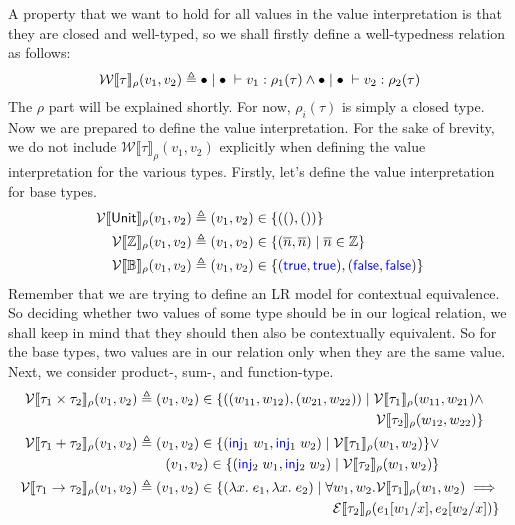 \documentclass[twoside,11pt,openright]{report}
\theoremstyle{definition}
\newcommand{\Keyword}[1]{{\color{blue} \mathsf{#1}}}
\newcommand{\var}{x}
\newcommand{\expr}{e}
\newcommand{\val}{v}
\newcommand{\valB}{w}
\newcommand{\TT}{()}
\newcommand{\Num}[1]{\overline{#1}}
\newcommand{\True}{\Keyword{true}}
\newcommand{\False}{\Keyword{false}}
\newcommand{\Inj}[1]{\Keyword{inj}_{#1}\;}
\newcommand{\subst}[3]{#1{\left[#3 \middle/ #2 \right]}}
\newcommand{\Tunit}{\mathsf{Unit}}
\newcommand{\Tint}{\mathbb{Z}}
\newcommand{\Tbool}{\mathbb{B}}
\newcommand{\Tprod}[2]{#1 \times #2}
\newcommand{\Tsum}[2]{#1 + #2}
\newcommand{\Tfunc}[2]{#1 \rightarrow #2}
\newcommand{\typ}{\tau}
\newcommand{\emptenv}{\bullet}
\newcommand{\empvenv}{\bullet}
\newcommand{\jdg}[4]{#1 \; | \; #2 \; \vdash #3 : #4}
\newcommand{\WtInp}[2]{\mathcal{W} \llbracket #1 \rrbracket_{#2}}
\newcommand{\WtInpGen}[2]{\WtInp{#1}{#2}(\val_1, \val_2)}
\newcommand{\ValInp}[2]{\mathcal{V} \llbracket #1 \rrbracket_{#2}}
\newcommand{\ValInpGen}[2]{\ValInp{#1}{#2}(\val_1, \val_2)}
\newcommand{\ExpInp}[2]{\mathcal{E} \llbracket #1 \rrbracket_{#2}}
\begin{document}
A property that we want to hold for all values in the value interpretation is that they are closed and well-typed, so we shall firstly define a well-typedness relation as follows:
\begin{equation*}
  \WtInpGen{\typ}{\rho} \triangleq \jdg{\emptenv}{\empvenv}{\val_1}{\rho_1(\typ)} \land \jdg{\emptenv}{\empvenv}{\val_2}{\rho_2(\typ)}\\
\end{equation*}
The $\rho$ part will be explained shortly. For now, $\rho_i(\typ)$ is simply a closed type.\\
Now we are prepared to define the value interpretation. For the sake of brevity, we do not include $\WtInpGen{\typ}{\rho}$ explicitly when defining the value interpretation for the various types. Firstly, let's define the value interpretation for base types.
\begin{align*}
  \ValInpGen{\Tunit}{\rho}  &\triangleq (\val_1, \val_2) \in \{(\TT, \TT)\}\\
  \ValInpGen{\Tint}{\rho}   &\triangleq (\val_1, \val_2) \in \{(\Num{n}, \Num{n}) \mid \Num{n} \in \Tint\}\\
  \ValInpGen{\Tbool}{\rho}  &\triangleq (\val_1, \val_2) \in \{(\True, \True), (\False, \False)\}
\end{align*}
Remember that we are trying to define an LR model for contextual equivalence. So deciding whether two values of some type should be in our logical relation, we shall keep in mind that they should then also be contextually equivalent. So for the base types, two values are in our relation only when they are the same value.\\
Next, we consider product-, sum-, and function-type.
\begin{align*}
  \ValInpGen{\Tprod{\typ_1}{\typ_2}}{\rho}  &\triangleq 
  \begin{aligned}[t]
    (\val_1, \val_2) \in \{((\valB_{11}, \valB_{12}), (\valB_{21}, \valB_{22})) \mid \ValInp{\typ_1}{\rho}(\valB_{11}, \valB_{21}) \land\\ \ValInp{\typ_2}{\rho}(\valB_{12}, \valB_{22})\}
  \end{aligned}\\
  \ValInpGen{\Tsum{\typ_1}{\typ_2}}{\rho}   &\triangleq 
  \begin{aligned}[t]
    (\val_1, \val_2) \in \{(\Inj{1} \valB_1, \Inj{1} \valB_2) \mid \ValInp{\typ_1}{\rho}(\valB_1, \valB_2)\} \lor \\
    (\val_1, \val_2) \in \{(\Inj{2} \valB_1, \Inj{2} \valB_2) \mid \ValInp{\typ_2}{\rho}(\valB_1, \valB_2)\}
  \end{aligned}\\
  \ValInpGen{\Tfunc{\typ_1}{\typ_2}}{\rho}  &\triangleq 
  \begin{aligned}[t]
    (\val_1, \val_2) \in \{(\fun \var . \expr_1, \fun \var . \expr_2) \mid \forall \valB_1, \valB_2 . \ValInp{\typ_1}{\rho}(\valB_{1}, \valB_{2}) \implies\\
    \ExpInp{\typ_2}{\rho}(\subst{\expr_1}{\var}{\valB_1}, \subst{\expr_2}{\var}{\valB_2})\}
  \end{aligned}
\end{align*}
\end{document}

